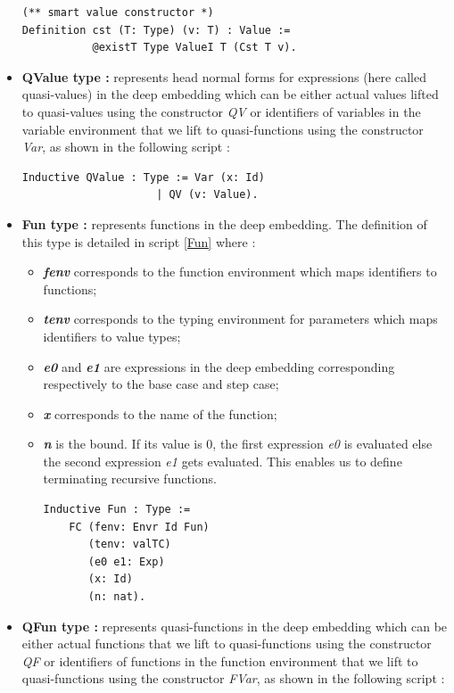 \begin{itemize}
\begin{lstlisting}[caption = {Values in the deep embedding},xleftmargin=.02\textwidth,xrightmargin=.02\textwidth]
(** smart value constructor *)
Definition cst (T: Type) (v: T) : Value :=
           @existT Type ValueI T (Cst T v).
\end{lstlisting}
	\item \textbf{QValue type :} represents head normal forms for expressions (here called quasi-values) in the deep embedding which can be either actual values lifted to quasi-values using the constructor \textit{QV} or identifiers of variables in the variable environment that we lift to quasi-functions using the constructor \textit{Var}, as shown in the following script :
\begin{lstlisting}[caption = {Quasi-values in the deep embedding},xleftmargin=.08\textwidth,
xrightmargin=.1\textwidth]
Inductive QValue : Type := Var (x: Id) 
	                 | QV (v: Value).
\end{lstlisting}
	\item \textbf{Fun type :} represents functions in the deep embedding. The definition of this type is detailed in script \ref{Fun} where :
	\begin{itemize}
		\item \textbf{\textit{fenv}} corresponds to the function environment which maps identifiers to functions;
		\item \textbf{\textit{tenv}} corresponds to the typing environment for parameters which maps identifiers to value types;
		\item \textbf{\textit{e0}} and \textbf{\textit{e1}} are expressions in the deep embedding corresponding respectively to the base case and step case;
		\item \textbf{\textit{x}} corresponds to the name of the function;
		\item \textbf{\textit{n}} is the bound. If its value is 0, the first expression \textit{e0} is evaluated else the second expression \textit{e1} gets evaluated. This enables us to define terminating recursive functions.
\vfill
\begin{lstlisting}[caption = {Functions in the deep embedding},label={Fun},xleftmargin=.08\textwidth,
xrightmargin=.22\textwidth]
Inductive Fun : Type :=
	FC (fenv: Envr Id Fun) 
	   (tenv: valTC)
	   (e0 e1: Exp)
	   (x: Id)
	   (n: nat).
\end{lstlisting}
	\end{itemize}
	\item \textbf{QFun type :} represents quasi-functions in the deep embedding which can be either actual functions that we lift to quasi-functions using the constructor \textit{QF} or identifiers of functions in the function environment that we lift to quasi-functions using the constructor \textit{FVar}, as shown in the following script :

\end{itemize}
